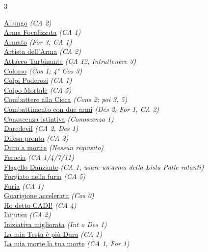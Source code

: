 \begin{multicols}{3}
{\begin{flushleft}
\hyperlink{Allungo}{Allungo} \textit{(CA 2)}\\
\hyperlink{Arma Focalizzata}{Arma Focalizzata} \textit{(CA 1)}\\
\hyperlink{Armato}{Armato} \textit{(For 3, CA 1)}\\
\hyperlink{Artista dell'Arma}{Artista dell'Arma} \textit{(CA 2)}\\
\hyperlink{Attacco Turbinante}{Attacco Turbinante} \textit{(CA 12, Intrattenere 3)}\\
\hyperlink{Colosso}{Colosso} \textit{(Cos 1; 4° Cos 3)}\\
\hyperlink{Colpi Poderosi}{Colpi Poderosi} \textit{(CA 1)}\\
\hyperlink{Colpo Mortale}{Colpo Mortale} \textit{(CA 5)}\\
\hyperlink{Combattere alla Cieca}{Combattere alla Cieca} \textit{(Cons 2; poi 3, 5)}\\
\hyperlink{Combattimento con due armi}{Combattimento con due armi} \textit{(Des 2, For 1, CA 2)}\\
\hyperlink{Conoscenza istintiva}{Conoscenza istintiva} \textit{(Conoscenza 1)}\\
\hyperlink{Daredevil}{Daredevil} \textit{(CA 2, Des 1)}\\
\hyperlink{Difesa pronta}{Difesa pronta} \textit{(CA 2)}\\
\hyperlink{Duro a morire}{Duro a morire} \textit{(Nessun requisito)}\\
\hyperlink{Ferocia}{Ferocia} \textit{(CA 1/4/7/11)}\\
\hyperlink{Flagello Danzante}{Flagello Danzante} \textit{(CA 1, usare un'arma della Lista Palle rotanti)}\\
\hyperlink{Forgiato nella furia}{Forgiato nella furia} \textit{(CA 5)}\\
\hyperlink{Furia}{Furia} \textit{(CA 1)}\\
\hyperlink{Guarigione accelerata}{Guarigione accelerata} \textit{(Cos 0)}\\
\hyperlink{Ho detto CADI!}{Ho detto CADI!} \textit{(CA 4)}\\
\hyperlink{Iaijutsu}{Iaijutsu} \textit{(CA 2)}\\
\hyperlink{Iniziativa migliorata}{Iniziativa migliorata} \textit{(Int o Des 1)}\\
\hyperlink{La mia Testa è più Dura}{La mia Testa è più Dura} \textit{(CA 1)}\\
\hyperlink{La mia morte la tua morte}{La mia morte la tua morte} \textit{(CA 1, For 1)}\\

\end{flushleft}}
\end{multicols}
